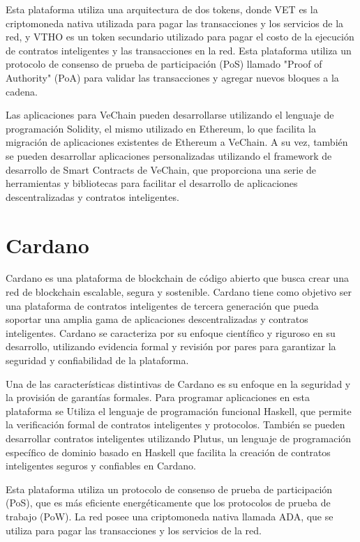 \documentclass{article}
\begin{document}
Esta plataforma utiliza una arquitectura de dos tokens, donde VET es la criptomoneda nativa utilizada para pagar las transacciones y los servicios de la red, y VTHO es un token secundario utilizado para pagar el costo de la ejecución de contratos inteligentes y las transacciones en la red. Esta plataforma utiliza un protocolo de consenso de prueba de participación (PoS) llamado "Proof of Authority" (PoA) para validar las transacciones y agregar nuevos bloques a la cadena.

Las aplicaciones para VeChain pueden desarrollarse utilizando el lenguaje de programación Solidity, el mismo utilizado en Ethereum, lo que facilita la migración de aplicaciones existentes de Ethereum a VeChain. A su vez, también se pueden desarrollar aplicaciones personalizadas utilizando el framework de desarrollo de Smart Contracts de VeChain, que proporciona una serie de herramientas y bibliotecas para facilitar el desarrollo de aplicaciones descentralizadas y contratos inteligentes.

\section{Cardano}

Cardano es una plataforma de blockchain de código abierto que busca crear una red de blockchain escalable, segura y sostenible. Cardano tiene como objetivo ser una plataforma de contratos inteligentes de tercera generación que pueda soportar una amplia gama de aplicaciones descentralizadas y contratos inteligentes. Cardano se caracteriza por su enfoque científico y riguroso en su desarrollo, utilizando evidencia formal y revisión por pares para garantizar la seguridad y confiabilidad de la plataforma.

Una de las características distintivas de Cardano es su enfoque en la seguridad y la provisión de garantías formales. Para programar aplicaciones en esta plataforma se
Utiliza el lenguaje de programación funcional Haskell, que permite la verificación formal de contratos inteligentes y protocolos. También se pueden desarrollar contratos inteligentes utilizando Plutus, un lenguaje de programación específico de dominio basado en Haskell que facilita la creación de contratos inteligentes seguros y confiables en Cardano.

Esta plataforma utiliza un protocolo de consenso de prueba de participación (PoS), que es más eficiente energéticamente que los protocolos de prueba de trabajo (PoW). La red posee una criptomoneda nativa llamada ADA, que se utiliza para pagar las transacciones y los servicios de la red.
\end{document}
